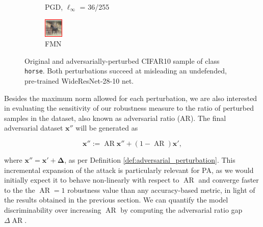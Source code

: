 \begin{figure}[H]
\begin{subfigure}[b]{0.25\textwidth}
        \caption{PGD, $\ell_\infty$ = 36/255}
    \end{subfigure}
    \hfill
    \begin{subfigure}[b]{0.25\textwidth}
        \centering
        \includegraphics[width=\textwidth]{img/results_discussion/adversarial/adv_fmn_framed.png}
        \caption{FMN}
    \end{subfigure}
    \caption{Original and adversarially-perturbed CIFAR10 sample of class \texttt{horse}. Both perturbations succeed
    at misleading an undefended, pre-trained WideResNet-28-10 net.}
\end{figure}

Besides the maximum norm allowed for each perturbation, we are also interested in evaluating 
the sensitivity of our robustness measure to the ratio of perturbed samples in the dataset, 
also known as adversarial ratio (AR). The final adversarial dataset $\bm{x}''$ will be generated as

$$
\bm{x}'' := \operatorname{AR} \bm{x}'' + (1 - \operatorname{AR}) \bm{x}',
$$

where $\bm{x}'' = \bm{x}' + \bm{\Delta}$, as per Definition \ref{def:adversarial_perturbation}.
This incremental expansion of the attack is particularly relevant for PA, as we would initially 
expect it to behave non-linearly with respect to $\operatorname{AR}$ and converge faster to
the the $\operatorname{AR}=1$ robustness value than any accuracy-based metric, in light of the results obtained
in the previous section. We can quantify the model discriminability over increasing $\operatorname{AR}$
by computing the adversarial ratio gap $\Delta \operatorname{AR}$.\\

